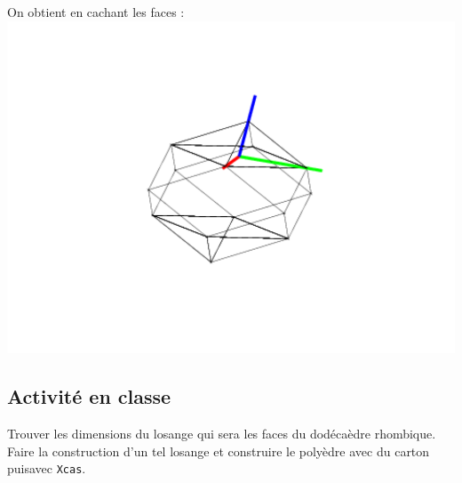 \documentclass[a4paper,11pt]{book}
\begin{document}
On obtient en cachant les faces :\\
\includegraphics[width=\textwidth]{doderhomb1}\subsection{Activit\'e en classe}
Trouver les dimensions du losange qui sera les faces du 
dod\'eca\`edre rhombique.
Faire la construction d'un tel losange et construire le poly\`edre avec du 
carton puisavec {\tt Xcas}.\\
\end{document}
